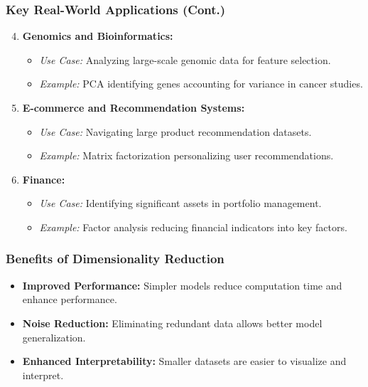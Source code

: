 \documentclass[aspectratio=169]{beamer}
\begin{document}
\begin{frame}[fragile]
  \frametitle{Key Real-World Applications (Cont.)}
  \begin{enumerate}
    \setcounter{enumi}{3}
    \item \textbf{Genomics and Bioinformatics:}
    \begin{itemize}
      \item \textit{Use Case:} Analyzing large-scale genomic data for feature selection.
      \item \textit{Example:} PCA identifying genes accounting for variance in cancer studies.
    \end{itemize}
    
    \item \textbf{E-commerce and Recommendation Systems:}
    \begin{itemize}
      \item \textit{Use Case:} Navigating large product recommendation datasets.
      \item \textit{Example:} Matrix factorization personalizing user recommendations.
    \end{itemize}
    
    \item \textbf{Finance:}
    \begin{itemize}
      \item \textit{Use Case:} Identifying significant assets in portfolio management.
      \item \textit{Example:} Factor analysis reducing financial indicators into key factors.
    \end{itemize}
  \end{enumerate}
\end{frame}

\begin{frame}[fragile]
  \frametitle{Benefits of Dimensionality Reduction}
  \begin{itemize}
    \item \textbf{Improved Performance:} Simpler models reduce computation time and enhance performance.
    \item \textbf{Noise Reduction:} Eliminating redundant data allows better model generalization.
    \item \textbf{Enhanced Interpretability:} Smaller datasets are easier to visualize and interpret.
  \end{itemize}
\end{frame}
\end{document}
